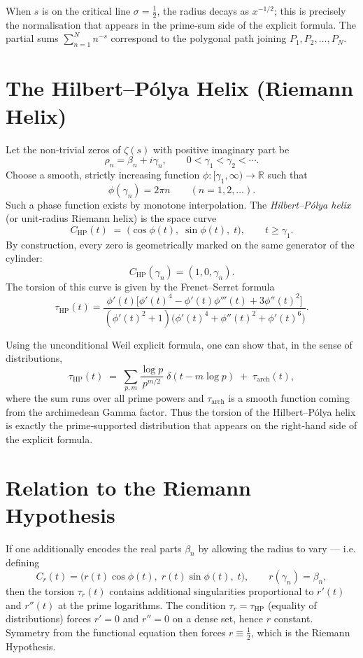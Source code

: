 \documentclass[12pt,a4paper]{article}
\begin{document}
When \(s\) is on the critical line \(\sigma = \frac12\), the radius decays as \(x^{-1/2}\); this is precisely the normalisation that appears in the prime‑sum side of the explicit formula.  
The partial sums \(\sum_{n=1}^{N} n^{-s}\) correspond to the polygonal path joining \(P_1, P_2, \dots, P_N\).

\section{The Hilbert--P\'olya Helix (Riemann Helix)}
Let the non‑trivial zeros of \(\zeta(s)\) with positive imaginary part be
\[
\rho_n = \beta_n + i \gamma_n,\qquad 0 < \gamma_1 < \gamma_2 < \cdots .
\]
Choose a smooth, strictly increasing function \(\phi: [\gamma_1,\infty) \to \mathbb{R}\) such that
\[
\phi(\gamma_n) = 2\pi n \qquad (n = 1,2,\dots).
\]
Such a phase function exists by monotone interpolation.  The \emph{Hilbert--P\'olya helix} (or unit‑radius Riemann helix) is the space curve
\[
\boxed{\;
C_{\text{HP}}(t) \;=\; \bigl( \cos \phi(t),\; \sin \phi(t),\; t \bigr),\qquad t \ge \gamma_1 .
\;}
\]
By construction, every zero is geometrically marked on the same generator of the cylinder:
\[
C_{\text{HP}}(\gamma_n) = (1,0,\gamma_n).
\]
The torsion of this curve is given by the Frenet–Serret formula
\[
\tau_{\text{HP}}(t) = 
\frac{\phi'(t)\bigl[ \phi'(t)^4 - \phi'(t)\phi'''(t) + 3\phi''(t)^2 \bigr]}
     {(\phi'(t)^2 + 1)\bigl( \phi'(t)^4 + \phi''(t)^2 + \phi'(t)^6 \bigr)} .
\]

Using the unconditional Weil explicit formula, one can show that, in the sense of distributions,
\[
\tau_{\text{HP}}(t) \;=\; \sum_{p,m} \frac{\log p}{p^{m/2}}\;\delta(t - m \log p) \;+\; \tau_{\text{arch}}(t),
\]
where the sum runs over all prime powers and \(\tau_{\text{arch}}\) is a smooth function coming from the archimedean Gamma factor.  
Thus the torsion of the Hilbert--P\'olya helix is exactly the prime‑supported distribution that appears on the right‑hand side of the explicit formula.

\section{Relation to the Riemann Hypothesis}
If one additionally encodes the real parts \(\beta_n\) by allowing the radius to vary — i.e. defining
\[
C_{r}(t) = \bigl( r(t)\cos\phi(t),\; r(t)\sin\phi(t),\; t \bigr),\qquad r(\gamma_n)=\beta_n,
\]
then the torsion \(\tau_{r}(t)\) contains additional singularities proportional to \(r'(t)\) and \(r''(t)\) at the prime logarithms.  The condition \(\tau_{r} = \tau_{\text{HP}}\) (equality of distributions) forces \(r'=0\) and \(r''=0\) on a dense set, hence \(r\) constant.  Symmetry from the functional equation then forces \(r \equiv \frac12\), which is the Riemann Hypothesis.
\end{document}
